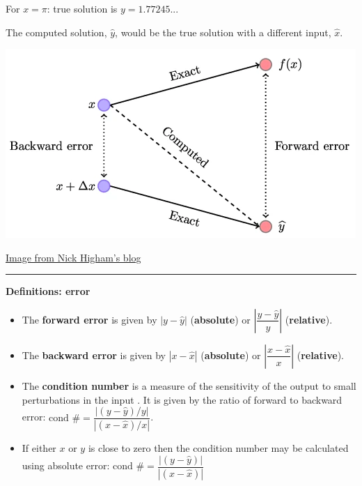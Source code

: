 \documentclass[12pt,letterpaper,noanswers]{exam}
\begin{document}
\noindent For $x = \pi$: true solution is $y = 1.77245...$


\noindent The computed solution, $\hat{y}$, would be the true solution with a different input, $\hat{x}$.


\includegraphics[scale=0.6]{img/C01errorNickHingham.png}

\href{https://nhigham.com/2020/03/25/what-is-backward-error/}{Image from Nick Higham's blog}

\vspace{0.2cm}
\hrule
\vspace{0.2cm}

\noindent \textbf{Definitions: error}

\begin{tcolorbox}
\begin{itemize}
\itemsep0pt
\item The \textbf{forward error} is given by $\left\vert y - \hat{y}\right\vert$ (\textbf{absolute}) or $\left\vert \dfrac{y - \hat{y}}{y}\right\vert$ (\textbf{relative}).
\item The \textbf{backward error} is given by $\left\vert x - \hat{x}\right\vert$ (\textbf{absolute}) or $\left\vert \dfrac{x - \hat{x}}{x}\right\vert$ (\textbf{relative}).
\item The \textbf{condition number} is a measure of the sensitivity of the output to small perturbations in the input \cite{higham2020condition}.  It is given by the ratio of forward to backward error: $\text{cond } \# = \dfrac{\left\vert (y - \hat{y})/y\right\vert}{\left\vert (x - \hat{x})/x\right\vert}$.  

\item If either $x$ or $y$ is close to zero then the condition number may be calculated using absolute error: $\text{cond } \#=\dfrac{\left\vert (y - \hat{y})\right\vert}{\left\vert (x - \hat{x})\right\vert}$
\end{itemize}

\end{tcolorbox}
\end{document}
